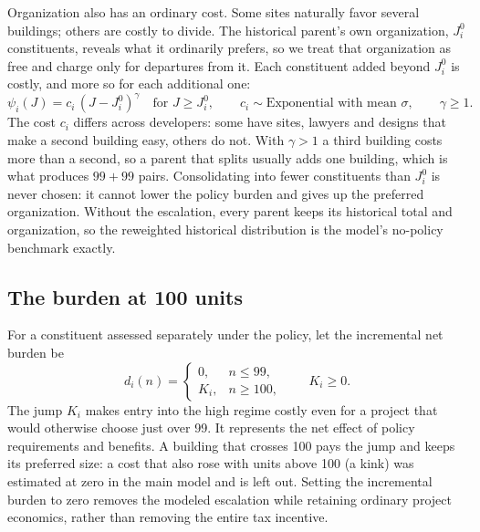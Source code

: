 \documentclass[11pt]{article}
\begin{document}
Organization also has an ordinary cost. Some sites naturally favor several buildings; others are costly to divide. The historical parent's own organization, $J_i^0$ constituents, reveals what it ordinarily prefers, so we treat that organization as free and charge only for departures from it. Each constituent added beyond $J_i^0$ is costly, and more so for each additional one:
\begin{equation}
\psi_i(J)=c_i\,(J-J_i^0)^{\gamma}\quad\text{for }J\ge J_i^0,
\qquad c_i\sim\text{Exponential with mean }\sigma,
\qquad \gamma\ge1.
\label{eq:organization}
\end{equation}
The cost $c_i$ differs across developers: some have sites, lawyers and designs that make a second building easy, others do not. With $\gamma>1$ a third building costs more than a second, so a parent that splits usually adds one building, which is what produces $99+99$ pairs. Consolidating into fewer constituents than $J_i^0$ is never chosen: it cannot lower the policy burden and gives up the preferred organization. Without the escalation, every parent keeps its historical total and organization, so the reweighted historical distribution is the model's no-policy benchmark exactly.

\subsection{The burden at 100 units}

For a constituent assessed separately under the policy, let the incremental net burden be
\begin{equation}
d_i(n)=
\begin{cases}
0,& n\le99,\\[2pt]
K_i,& n\ge100,
\end{cases}
\qquad K_i\ge0.
\label{eq:burden}
\end{equation}
The jump $K_i$ makes entry into the high regime costly even for a project that would otherwise choose just over 99. It represents the net effect of policy requirements and benefits. A building that crosses 100 pays the jump and keeps its preferred size: a cost that also rose with units above 100 (a kink) was estimated at zero in the main model and is left out. Setting the incremental burden to zero removes the modeled escalation while retaining ordinary project economics, rather than removing the entire tax incentive.
\end{document}
